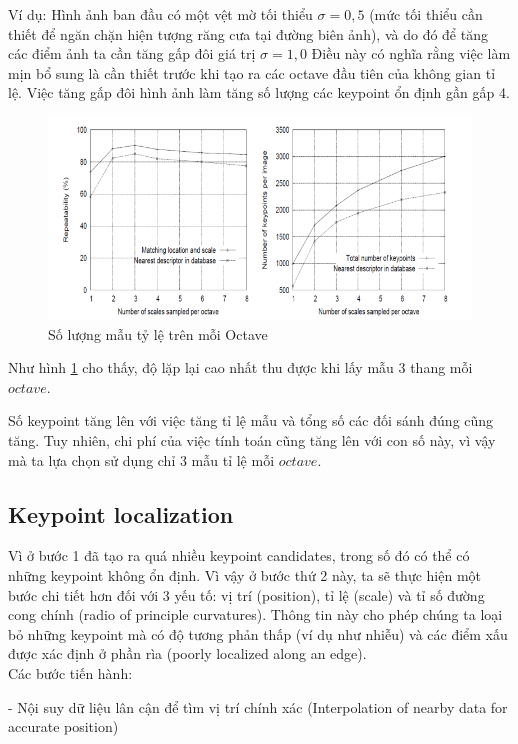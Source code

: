 \documentclass[conference]{IEEEtran}
\begin{document}
Ví dụ: Hình ảnh ban đầu có một vệt mờ tối thiểu $\sigma = 0,5$ (mức tối thiểu cần thiết để ngăn chặn hiện tượng răng cưa tại đường biên ảnh), và do đó để tăng các điểm ảnh ta cần tăng gấp đôi giá trị $\sigma = 1,0$ Điều này có nghĩa rằng việc làm mịn bổ sung là cần thiết trước khi tạo ra các octave đầu tiên của không gian tỉ lệ. Việc tăng gấp đôi hình ảnh làm tăng số lượng các keypoint ổn định gần gấp 4.
\begin{figure}
  \includegraphics[width=\linewidth]{soluonglaymau_phu}
  \caption{Số lượng mẫu tỷ lệ trên mỗi Octave}
  \label{fig:soluonglaymau_phu}
\end{figure}
 
Như hình \ref{fig:soluonglaymau_phu} cho thấy, độ lặp lại cao nhất thu đựợc khi lấy mẫu 3 thang mỗi $octave$.

Số keypoint tăng lên với việc tăng tỉ lệ mẫu và tổng số các đối sánh đúng cũng tăng. Tuy nhiên, chi phí của việc tính toán cũng tăng lên với con số này, vì vậy mà ta lựa chọn sử dụng chỉ 3 mẫu tỉ lệ mỗi $octave$.

\subsection{Keypoint localization}
Vì ở bước 1 đã tạo ra quá nhiều keypoint candidates, trong số đó có thể có những keypoint không ổn định. Vì vậy ở bước thứ 2 này, ta sẽ thực hiện một bước chi tiết hơn đối với 3 yếu tố: vị trí (position), tỉ lệ (scale) và tỉ số đường cong chính (radio of principle curvatures). Thông tin này cho phép chúng ta loại bỏ những keypoint mà có độ tương phản thấp (ví dụ như nhiễu) và các điểm xấu được xác định ở phần rìa (poorly localized along an edge).\\


Các bước tiến hành:

	- Nội suy dữ liệu lân cận để tìm vị trí chính xác (Interpolation of nearby data for accurate position)
	
\end{document}
